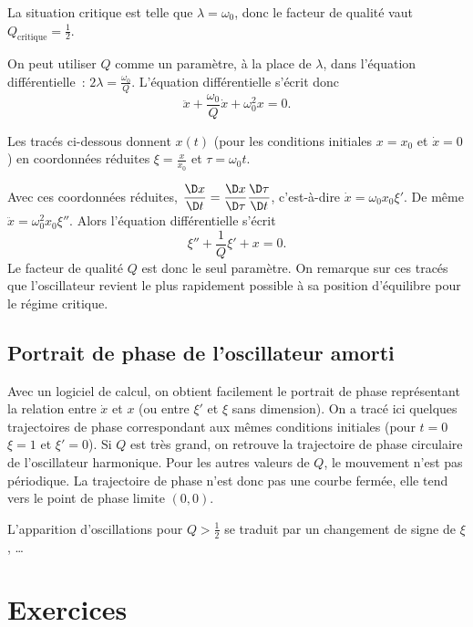 La situation critique est telle que $\lambda = \omega_0$, donc le facteur de qualité vaut $Q_{\text{critique}} = \frac{1}{2}$.

On peut utiliser $Q$ comme un paramètre, à la place de $\lambda$, dans l'équation différentielle~: $2\lambda = \frac{\omega_0}{Q}$. L'équation différentielle s'écrit donc
\begin{equation}
  \ddot x +\frac{\omega_0}{Q} \dot x +\omega_0^2 x = 0.
\end{equation}

Les tracés ci-dessous donnent $x(t)$ (pour les conditions initiales $x=x_0$ et $\dot x=0$) en coordonnées réduites $\xi=\frac{x}{x_0}$ et $\tau = \omega_0 t$.

Avec ces coordonnées réduites, $\derived{x}{t} = \derived{x}{\tau} \derived{\tau}{t}$, c'est-à-dire $\dot x = \omega_0 x_0 \xi'$. De même $\ddot x = \omega_0^2 x_0 \xi''$. Alors l'équation différentielle s'écrit
\begin{equation}
  \xi'' +\frac{1}{Q} \xi'+x=0.
\end{equation}
Le facteur de qualité $Q$ est donc le seul paramètre. On remarque sur ces tracés que l'oscillateur revient le plus rapidement possible à sa position d'équilibre pour le régime critique.

\subsection{Portrait de phase de l'oscillateur amorti}
\label{chap5-subsec:portraitdephasedeloscillateuramorti}

Avec un logiciel de calcul, on obtient facilement le portrait de phase représentant la relation entre $\dot x$ et $x$ (ou entre $\xi'$ et $\xi$ sans dimension). On a tracé ici quelques trajectoires de phase correspondant aux mêmes conditions initiales (pour $t=0$ $\xi=1$ et $\xi'=0$). Si $Q$ est très grand, on retrouve la trajectoire de phase circulaire de l'oscillateur harmonique. Pour les autres valeurs de $Q$, le mouvement n'est pas périodique. La trajectoire de phase n'est donc pas une courbe fermée, elle tend vers le point de phase limite $(0,0)$.

L'apparition d'oscillations pour $Q>\frac{1}{2}$ se traduit par un changement de signe de $\xi$, \ldots

\section{Exercices}
\label{chap5-sec:exercices}

